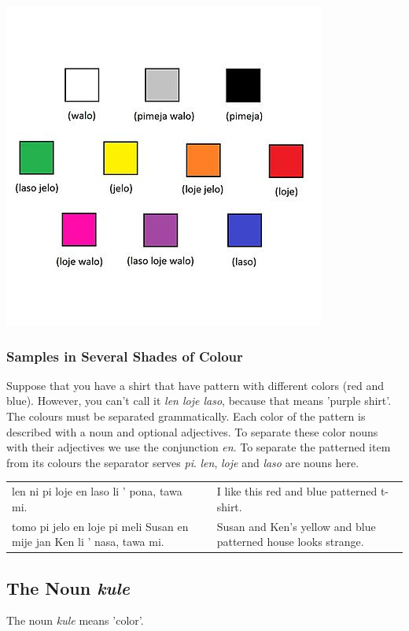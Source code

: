 %
\includegraphics[scale=0.4]{colors.png}
%
\subsubsection*{Samples in Several Shades of Colour}
%
%
Suppose that you have a shirt that have pattern with different colors (red and blue).
However, you can't call it \textit{len loje laso}, because that means 'purple shirt'.
The colours must be separated grammatically.
Each color of the pattern is described with a noun and optional adjectives.
To separate these color nouns with their adjectives we use the conjunction \textit{en}.
To separate the patterned item from its colours the separator serves \textit{pi}.
\textit{len}, \textit{loje} and \textit{laso} are nouns here.

\begin{supertabular}{p{5,5cm}|ll}
    len ni pi loje en laso li ' pona, tawa mi.                             &  & I like this red and blue patterned t-shirt.                    \\
    tomo pi jelo en loje pi meli Susan en mije jan Ken li ' nasa, tawa mi. &  & Susan and Ken's yellow and blue patterned house looks strange. \\
\end{supertabular}

%
\subsection*{The Noun \textit{kule}}
%
%
The noun \textit{kule} means 'color'.

